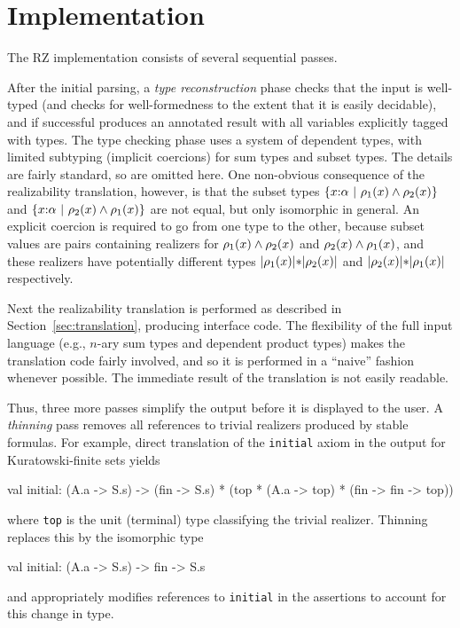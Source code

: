 \section{Implementation}
\label{sec:implementation}

The RZ implementation consists of several sequential passes.

After the initial parsing, a \emph{type reconstruction} phase checks
that the input is well-typed (and checks for well-formedness to the
extent that it is easily decidable), and if successful produces an
annotated result with all variables explicitly tagged with types. The
type checking phase uses a system of dependent types, with limited
subtyping (implicit coercions) for sum types and subset types. The
details are fairly standard, so are omitted here. One non-obvious
consequence of the realizability translation, however, is that the
subset types $\{x{:}\alpha\ |\ \rho_1(x)\land \rho_2(x)\}$ and
$\{x{:}\alpha\ |\ \rho_2(x)\land \rho_1(x)\}$ are not
equal, but only isomorphic in general. An
explicit coercion is required to go from one type to the other,
because subset values are pairs containing realizers for
$\rho_1(x)\land \rho_2(x)$ and
$\rho_2(x)\land \rho_1(x)$, and these realizers have
potentially different types $|\rho_1(x)|\mathtt{*}|\rho_2(x)|$ and
$|\rho_2(x)|\mathtt{*}|\rho_1(x)|$ respectively.

Next the realizability translation is performed as described in
Section~\ref{sec:translation}, producing interface code. The
flexibility of the full input language (e.g., $n$-ary sum types and
dependent product types) makes the translation code fairly involved,
and so it is performed in a ``naive'' fashion whenever possible. The
immediate result of the translation is not easily readable.
 

Thus, three more passes simplify the output before it is displayed to
the user. A \emph{thinning} pass removes all references to trivial
realizers produced by stable formulas. For example, direct translation
of the \texttt{initial} axiom in the output for Kuratowski-finite sets
yields
\begin{source}
val initial: (A.a -> S.s) -> (fin -> S.s) * (top * (A.a -> top) * (fin -> fin -> top))
\end{source}
where \texttt{top} is the unit (terminal) type classifying the trivial realizer.  Thinning replaces this by the isomorphic type
\begin{source}
val initial: (A.a -> S.s) -> fin -> S.s
\end{source}
and appropriately modifies references to \texttt{initial} in the assertions to account for this change in type.

